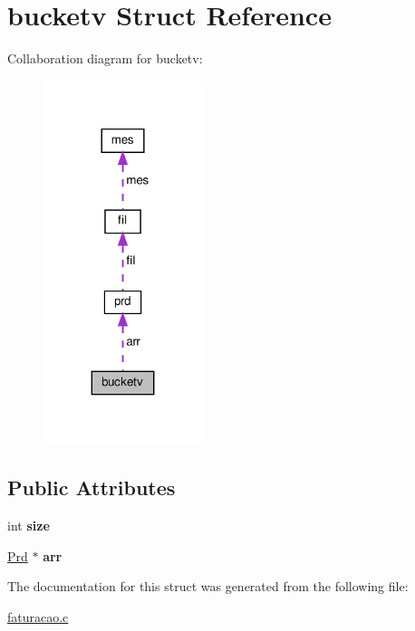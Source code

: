 \hypertarget{structbucketv}{}\section{bucketv Struct Reference}
\label{structbucketv}


Collaboration diagram for bucketv\+:
\nopagebreak
\begin{figure}[H]
\begin{center}
\leavevmode
\includegraphics[width=131pt]{structbucketv__coll__graph}
\end{center}
\end{figure}
\subsection*{Public Attributes}
\begin{DoxyCompactItemize}
\item 
\mbox{\label{structbucketv_ad6d992292eafe2b9e38ae633e07a2f7b}} 
int {\bfseries size}
\item 
\mbox{\label{structbucketv_a8890f3fe25c884f2acd544722f31a987}} 
\hyperlink{structprd}{Prd} $\ast$ {\bfseries arr}
\end{DoxyCompactItemize}


The documentation for this struct was generated from the following file\+:\begin{DoxyCompactItemize}
\item 
\hyperlink{faturacao_8c}{faturacao.\+c}\end{DoxyCompactItemize}
